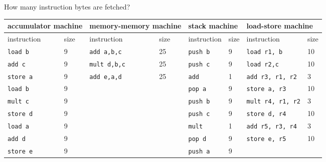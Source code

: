 \documentclass{article}
\begin{document}
\subsubsection{}
How many instruction bytes are fetched?\\
\begin{tabular}{l|ll|ll|ll|l|}
\hline
\multicolumn{2}{|l|}{accumulator machine} & \multicolumn{2}{|l|}{memory-memory machine} & \multicolumn{2}{|l|}{stack machine} & \multicolumn{2}{|l|}{load-store machine} \\ \hline
\multicolumn{1}{|l|}{instruction} & size & \multicolumn{1}{|l|}{instruction} & size & \multicolumn{1}{|l|}{instruction} & size & \multicolumn{1}{|l|}{instruction} & size \\ \hline
\multicolumn{1}{|l|}{\texttt{load b}} & 9 & \multicolumn{1}{|l|}{\texttt{add a,b,c}} & 25 & \multicolumn{1}{|l|}{\texttt{push b}} & 9 &\multicolumn{1}{|l|}{\texttt{load r1, b}} & 10 \\ 
\multicolumn{1}{|l|}{\texttt{add c}} & 9 &\multicolumn{1}{|l|}{\texttt{mult d,b,c}} & 25 & \multicolumn{1}{|l|}{\texttt{push c}} & 9 & \multicolumn{1}{|l|}{\texttt{load r2,c}} & 10 \\
\multicolumn{1}{|l|}{\texttt{store a}} & 9 & \multicolumn{1}{|l|}{\texttt{add e,a,d}} & 25 & \multicolumn{1}{|l|}{\texttt{add}} & 1 & \multicolumn{1}{|l|}{\texttt{add r3, r1, r2}} & 3\\
\multicolumn{1}{|l|}{\texttt{load b}} & 9 & \multicolumn{1}{|l|}{} & & \multicolumn{1}{|l|}{\texttt{pop a}} & 9 & \multicolumn{1}{|l|}{\texttt{store a, r3}} & 10\\
\multicolumn{1}{|l|}{\texttt{mult c}} & 9 & \multicolumn{1}{|l|}{} & & \multicolumn{1}{|l|}{\texttt{push b}} & 9 & \multicolumn{1}{|l|}{\texttt{mult r4, r1, r2}} & 3 \\
\multicolumn{1}{|l|}{\texttt{store d}} & 9 & \multicolumn{1}{|l|}{} & &\multicolumn{1}{|l|}{\texttt{push c}} & 9 & \multicolumn{1}{|l|}{\texttt{store d, r4}} & 10\\ 
\multicolumn{1}{|l|}{\texttt{load a}} & 9 & \multicolumn{1}{|l|}{} & & \multicolumn{1}{|l|}{\texttt{mult}} & 1 & \multicolumn{1}{|l|}{\texttt{add r5, r3, r4}} & 3 \\
\multicolumn{1}{|l|}{\texttt{add d}} & 9 & \multicolumn{1}{|l|}{} & & \multicolumn{1}{|l|}{\texttt{pop d}} & 9 & \multicolumn{1}{|l|}{\texttt{store e, r5}} & 10\\
\multicolumn{1}{|l|}{\texttt{store e}} & 9 & \multicolumn{1}{|l|}{} & & \multicolumn{1}{|l|}{\texttt{push a}} & 9 & \multicolumn{1}{|l|}{} & \\

\end{tabular}
\end{document}
